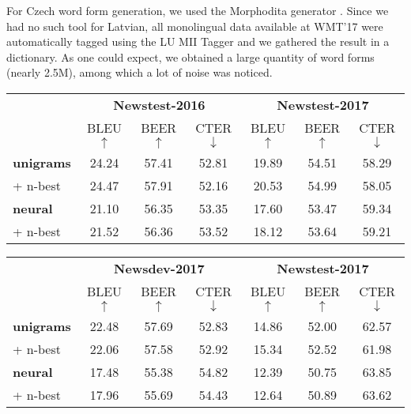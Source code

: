 \documentclass[11pt,letterpaper,final]{article}
\begin{document}
For Czech word form generation, we used the Morphodita
generator \cite{strakova14morphodita}. Since we had no
such tool for Latvian, all monolingual data available at
WMT'17 were automatically tagged using the LU MII Tagger
\cite{paikens13lv} and we gathered the result in a dictionary.
As one could expect, we obtained a large quantity of
word forms (nearly 2.5M), among which a lot of noise
was noticed.


\begin{table*}[!htbp]
\begin{center}
\small
\begin{tabular}{ lcccccc } 
\hline
  & \multicolumn{3}{c}{\textbf{Newstest-2016}} & \multicolumn{3}{c}{\textbf{Newstest-2017}} \\
  & BLEU $\uparrow$ & BEER $\uparrow$ & CTER $\downarrow$ & BLEU $\uparrow$ & BEER $\uparrow$ & CTER $\downarrow$ \\
\hline
\textbf{unigrams} & 24.24 & 57.41 & 52.81 & 19.89 & 54.51 & 58.29  \\
+ n-best          & 24.47 & 57.91 & 52.16 & 20.53 & 54.99 & 58.05 \\
\textbf{neural}   & 21.10 & 56.35 & 53.35 & 17.60 & 53.47 & 59.34 \\
+ n-best          & 21.52 & 56.36 & 53.52 & 18.12 & 53.64 & 59.21 \\
\hline
 \end{tabular} 
\caption{\label{tab:reinflect_cs} Scores for different English-to-Czech reinflection methods.}
\end{center}

\begin{center}
\small
\begin{tabular}{ lcccccc } 
\hline
  & \multicolumn{3}{c}{\textbf{Newsdev-2017}} & \multicolumn{3}{c}{\textbf{Newstest-2017}} \\
  & BLEU $\uparrow$ & BEER $\uparrow$ & CTER $\downarrow$ & BLEU $\uparrow$ & BEER $\uparrow$ & CTER $\downarrow$ \\
\hline
\textbf{unigrams} & 22.48 & 57.69 & 52.83 & 14.86 & 52.00 & 62.57 \\
+ n-best          & 22.06 & 57.58 & 52.92 & 15.34 & 52.52 & 61.98 \\
\textbf{neural}   & 17.48 & 55.38 & 54.82 & 12.39 & 50.75 & 63.85 \\
+ n-best          & 17.96 & 55.69 & 54.43 & 12.64 & 50.89 & 63.62 \\
\hline
 \end{tabular} 
\caption{\label{tab:reinflect_lv} Scores for different English-to-Latvian reinflection methods.}
\end{center}
\end{table*}
\end{document}
